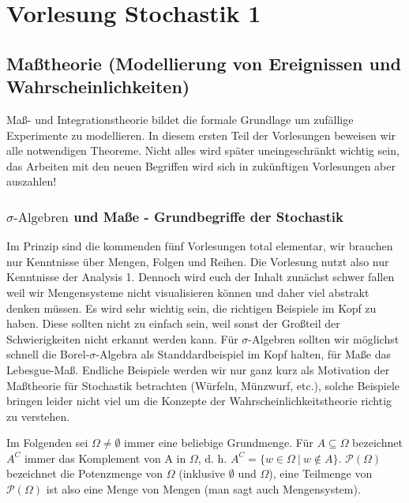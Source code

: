 
\part{Vorlesung Stochastik 1}


\chapter{Maßtheorie (Modellierung von Ereignissen und Wahrscheinlichkeiten)}
	\marginpar{\textcolor{red}{Vorlesung 1}}
Ma\ss - und Integrationstheorie bildet die formale Grundlage um zuf\"allige Experimente zu modellieren. In diesem ersten Teil der Vorlesungen beweisen wir alle notwendigen Theoreme. Nicht alles wird sp\"ater uneingeschr\"ankt wichtig sein, das Arbeiten mit den neuen Begriffen wird sich in zuk\"unftigen Vorlesungen aber auszahlen!


\section{$\sigma\text{-Algebren}$ und Maße - Grundbegriffe der Stochastik}\label{sigmaalgebra}
Im Prinzip sind die kommenden f\"unf Vorlesungen total elementar, wir brauchen nur Kenntnisse \"uber Mengen, Folgen und Reihen. Die Vorlesung nutzt also nur Kenntnisse der Analysis 1. Dennoch wird euch der Inhalt zun\"achst schwer fallen weil wir Mengensysteme nicht visualisieren k\"onnen und daher viel abstrakt denken m\"ussen. Es wird sehr wichtig sein, die richtigen Beispiele im Kopf zu haben. Diese sollten nicht zu einfach sein, weil sonst der Gro\ss teil der Schwierigkeiten nicht erkannt werden kann. F\"ur $\sigma$-Algebren sollten wir m\"oglichst schnell die Borel-$\sigma$-Algebra als Standdardbeispiel im Kopf halten, f\"ur Ma\ss e das Lebesgue-Ma\ss. Endliche Beispiele werden wir nur ganz kurz als Motivation der Ma\ss theorie f\"ur Stochastik betrachten (W\"urfeln, M\"unzwurf, etc.), solche Beispiele bringen leider nicht viel um die Konzepte der Wahrscheinlichkeitstheorie richtig zu verstehen.\smallskip

Im Folgenden sei $\Omega \neq \emptyset $ immer eine beliebige Grundmenge. Für $A \subseteq \Omega$ bezeichnet $A^C$ immer das Komplement von A in $\Omega$, d. h. $A^C = \{ w \in \Omega \: | \: w \notin A \}$. $\mathcal{P}(\Omega)$ bezeichnet die Potenzmenge von $\Omega$ (inklusive $\emptyset$ und $\Omega$), eine Teilmenge von $\mathcal{P}(\Omega)$ ist also eine Menge von Mengen (man sagt auch Mengensystem).



